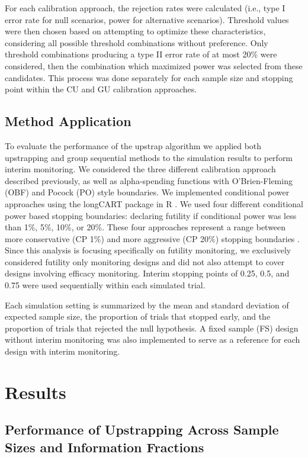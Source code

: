 \documentclass[Afour,sageh,times,square,numbers]{sagej}
\begin{document}
For each calibration approach, the rejection rates were calculated (i.e., type I error rate for null scenarios, power for alternative scenarios). Threshold values were then chosen based on attempting to optimize these characteristics, considering all possible threshold combinations without preference.  Only threshold combinations producing a type II error rate of at most 20\% were considered, then the combination which maximized power was selected from these candidates.  This process was done separately for each sample size and stopping point within the CU and GU calibration approaches.

\subsection{Method Application}

To evaluate the performance of the upstrap algorithm we applied both upstrapping and group sequential methods to the simulation results to perform interim monitoring.  We considered the three different calibration approach described previously, as well as alpha-spending functions with O’Brien-Fleming (OBF) and Pocock (PO) style boundaries.  We implemented conditional power approaches using the longCART package in R \cite{R8a}.  We used four different conditional power based stopping boundaries: declaring futility if conditional power was less than 1\%, 5\%, 10\%, or 20\%.  These four approaches represent a range between more conservative (CP 1\%) and more aggressive (CP 20\%) stopping boundaries \cite{R8b}.  Since this analysis is focusing specifically on futility monitoring, we exclusively considered futility only monitoring designs and did not also attempt to cover designs involving efficacy monitoring. Interim stopping points of 0.25, 0.5, and 0.75 were used sequentially within each simulated trial.

Each simulation setting is summarized by the mean and standard deviation of expected sample size, the proportion of trials that stopped early, and the proportion of trials that rejected the null hypothesis.  A fixed sample (FS) design without interim monitoring was also implemented to serve as a reference for each design with interim monitoring.

\section{Results}

\subsection{Performance of Upstrapping Across Sample Sizes and Information Fractions}
\end{document}
